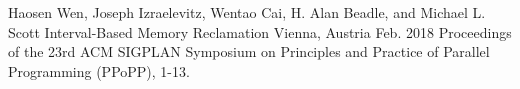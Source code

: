 

\begin{cventries}

  \cvpublication
    {Haosen Wen, Joseph Izraelevitz, Wentao Cai, H. Alan Beadle, and Michael L. Scott} %
    {Interval-Based Memory Reclamation} %
    {Vienna, Austria} %
    {Feb. 2018} %
    {Proceedings of the 23rd ACM SIGPLAN Symposium on Principles and Practice of Parallel Programming (PPoPP), 1-13.} %

\end{cventries}
